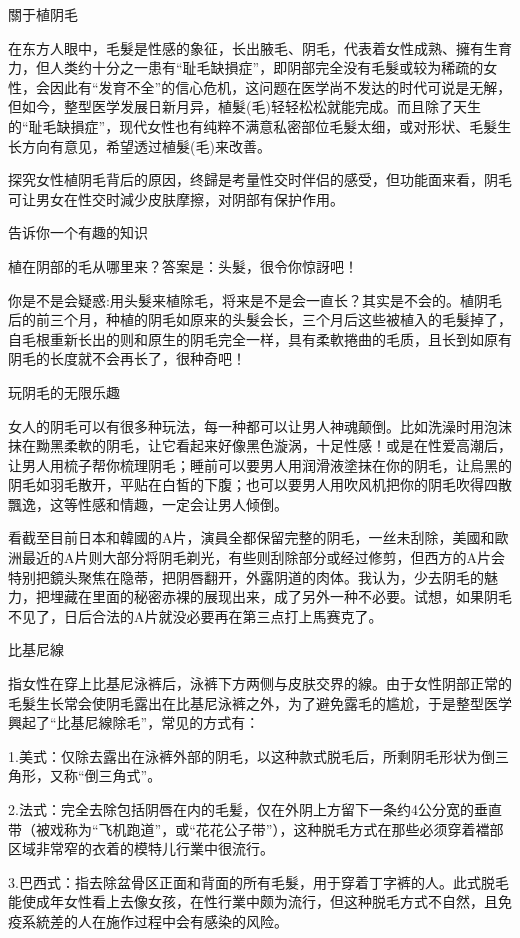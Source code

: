 \documentclass[12pt,UTF8]{ctexbook}
\begin{document}
關于植阴毛

在东方人眼中，毛髮是性感的象征，长出腋毛、阴毛，代表着女性成熟、擁有生育力，但人类约十分之一患有“耻毛缺損症”，即阴部完全没有毛髮或较为稀疏的女性，会因此有“发育不全”的信心危机，这问题在医学尚不发达的时代可说是无解，但如今，整型医学发展日新月异，植髮(毛)轻轻松松就能完成。而且除了天生的“耻毛缺損症”，现代女性也有纯粹不满意私密部位毛髮太细，或对形状、毛髮生长方向有意见，希望透过植髮(毛)来改善。

探究女性植阴毛背后的原因，终歸是考量性交时伴侣的感受，但功能面来看，阴毛可让男女在性交时減少皮肤摩擦，对阴部有保护作用。

告诉你一个有趣的知识

植在阴部的毛从哪里来？答案是：头髮，很令你惊訝吧！

你是不是会疑惑:用头髮来植除毛，将来是不是会一直长？其实是不会的。植阴毛后的前三个月，种植的阴毛如原来的头髮会长，三个月后这些被植入的毛髮掉了，自毛根重新长出的则和原生的阴毛完全一样，具有柔軟捲曲的毛质，且长到如原有阴毛的长度就不会再长了，很种奇吧！

玩阴毛的无限乐趣

女人的阴毛可以有很多种玩法，每一种都可以让男人神魂颠倒。比如洗澡时用泡沫抹在黝黑柔軟的阴毛，让它看起来好像黑色漩涡，十足性感！或是在性爱高潮后，让男人用梳子帮你梳理阴毛；睡前可以要男人用润滑液塗抹在你的阴毛，让烏黑的阴毛如羽毛散开，平贴在白皙的下腹；也可以要男人用吹风机把你的阴毛吹得四散飄逸，这等性感和情趣，一定会让男人倾倒。

看截至目前日本和韓國的A片，演員全都保留完整的阴毛，一丝未刮除，美國和歐洲最近的A片则大部分将阴毛剃光，有些则刮除部分或经过修剪，但西方的A片会特别把鏡头聚焦在隐蒂，把阴唇翻开，外露阴道的肉体。我认为，少去阴毛的魅力，把埋藏在里面的秘密赤裸的展现出来，成了另外一种不必要。试想，如果阴毛不见了，日后合法的A片就没必要再在第三点打上馬赛克了。

比基尼線

指女性在穿上比基尼泳裤后，泳裤下方两侧与皮肤交界的線。由于女性阴部正常的毛髮生长常会使阴毛露出在比基尼泳裤之外，为了避免露毛的尴尬，于是整型医学興起了“比基尼線除毛”，常见的方式有：

1.美式：仅除去露出在泳裤外部的阴毛，以这种款式脱毛后，所剩阴毛形状为倒三角形，又称“倒三角式”。

2.法式：完全去除包括阴唇在内的毛髪，仅在外阴上方留下一条约4公分宽的垂直带（被戏称为“飞机跑道”，或“花花公子带”），这种脱毛方式在那些必须穿着襠部区域非常窄的衣着的模特儿行業中很流行。

3.巴西式：指去除盆骨区正面和背面的所有毛髮，用于穿着丁字裤的人。此式脱毛能使成年女性看上去像女孩，在性行業中颇为流行，但这种脱毛方式不自然，且免疫系統差的人在施作过程中会有感染的风险。
\end{document}
